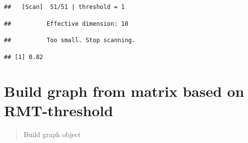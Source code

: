 \documentclass[
]{book}
\newenvironment{Shaded}{\begin{snugshade}}{\end{snugshade}}
\newcommand{\CommentTok}[1]{\textcolor[rgb]{0.56,0.35,0.01}{\textit{#1}}}
\newcommand{\NormalTok}[1]{#1}
\newcommand{\SpecialCharTok}[1]{\textcolor[rgb]{0.81,0.36,0.00}{\textbf{#1}}}
\begin{document}
\begin{verbatim}
##   [Scan]  51/51 | threshold = 1
\end{verbatim}

\begin{verbatim}
##          Effective dimension: 10
\end{verbatim}

\begin{verbatim}
##          Too small. Stop scanning.
\end{verbatim}

\begin{Shaded}
\end{Shaded}

\begin{verbatim}
## [1] 0.82
\end{verbatim}

\section{Build graph from matrix based on RMT-threshold}\label{build-graph-from-matrix-based-on-rmt-threshold}

\begin{quote}
Build graph object
\end{quote}
\end{document}
